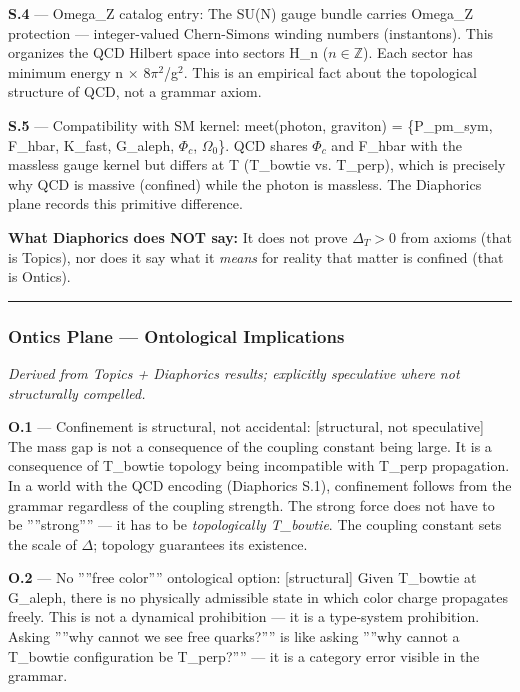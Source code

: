 \documentclass[11pt,a4paper]{article}
\begin{document}
\textbf{S.4} --- Omega\_Z catalog entry: The SU(N) gauge bundle carries Omega\_Z protection --- integer-valued Chern-Simons winding numbers (instantons). This organizes the QCD Hilbert space into sectors H\_n ($n \in \mathbb{Z}$). Each sector has minimum energy \textbar{}n\textbar{} $\times$ 8$\pi$$^{2}$/g$^{2}$. This is an empirical fact about the topological structure of QCD, not a grammar axiom.

\textbf{S.5} --- Compatibility with SM kernel: meet(photon, graviton) = \{P\_pm\_sym, F\_hbar, K\_fast, G\_aleph, $\Phi_c$, $\Omega_0$\}. QCD shares $\Phi_c$ and F\_hbar with the massless gauge kernel but differs at T (T\_bowtie vs. T\_perp), which is precisely why QCD is massive (confined) while the photon is massless. The Diaphorics plane records this primitive difference.

\textbf{What Diaphorics does NOT say:} It does not prove $\Delta_T > 0$ from axioms (that is Topics), nor does it say what it \emph{means} for reality that matter is confined (that is Ontics).

\begin{center}
\rule{0.5\textwidth}{0.4pt}
\end{center}

\subsubsection{Ontics Plane --- Ontological Implications}

\emph{Derived from Topics + Diaphorics results; explicitly speculative where not structurally compelled.}

\textbf{O.1} --- Confinement is structural, not accidental: {[}structural, not speculative{]} The mass gap is not a consequence of the coupling constant being large. It is a consequence of T\_bowtie topology being incompatible with T\_perp propagation. In a world with the QCD encoding (Diaphorics S.1), confinement follows from the grammar regardless of the coupling strength. The strong force does not have to be ''''strong'''' --- it has to be \emph{topologically T\_bowtie}. The coupling constant sets the scale of $\Delta$; topology guarantees its existence.

\textbf{O.2} --- No ''''free color'''' ontological option: {[}structural{]} Given T\_bowtie at G\_aleph, there is no physically admissible state in which color charge propagates freely. This is not a dynamical prohibition --- it is a type-system prohibition. Asking ''''why cannot we see free quarks?'''' is like asking ''''why cannot a T\_bowtie configuration be T\_perp?'''' --- it is a category error visible in the grammar.
\end{document}
